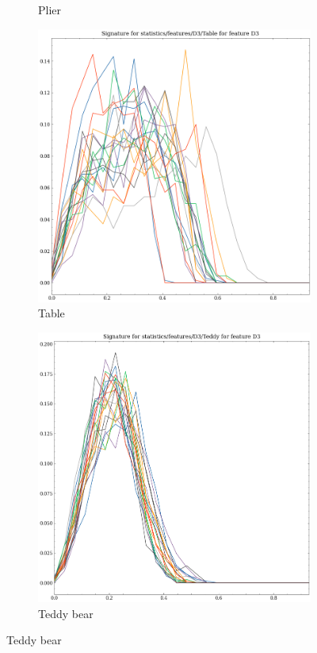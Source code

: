 \begin{figure}
\begin{subfigure}[b]{0.23\textwidth}
        \caption{Plier}
    \end{subfigure}
    \hfill
    \begin{subfigure}[b]{0.23\textwidth}
        \includegraphics[width=\textwidth]{assets/feature_extraction/D3/Table.png}
        \caption{Table}
    \end{subfigure}
    \hfill
    \begin{subfigure}[b]{0.23\textwidth}
        \includegraphics[width=\textwidth]{assets/feature_extraction/D3/Teddy.png}
        \caption{Teddy bear}
    \end{subfigure}
    \hfill


\end{figure}
